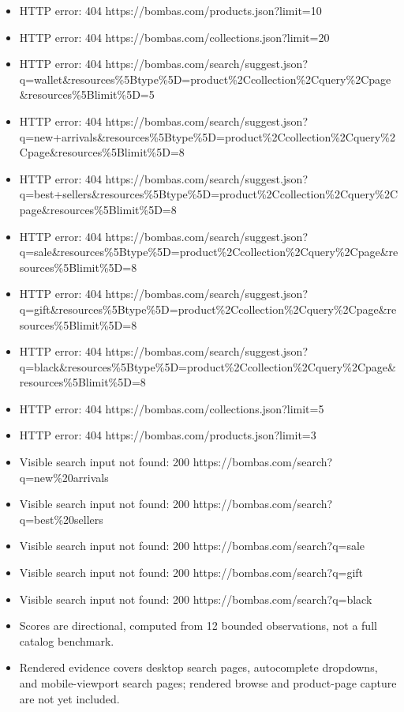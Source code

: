 \documentclass[10pt]{article}
\newcommand{\ReportBody}[1]{{\fontsize{9.4}{11.5}\selectfont\color{NVIInk}#1}}
\begin{document}
\begin{itemize}
\item \ReportBody{HTTP error: 404 https://bombas.com/products.json?limit=10}
\item \ReportBody{HTTP error: 404 https://bombas.com/collections.json?limit=20}
\item \ReportBody{HTTP error: 404 https://bombas.com/search/suggest.json?q=wallet\&resources\%5Btype\%5D=product\%2Ccollection\%2Cquery\%2Cpage\&resources\%5Blimit\%5D=5}
\item \ReportBody{HTTP error: 404 https://bombas.com/search/suggest.json?q=new+arrivals\&resources\%5Btype\%5D=product\%2Ccollection\%2Cquery\%2Cpage\&resources\%5Blimit\%5D=8}
\item \ReportBody{HTTP error: 404 https://bombas.com/search/suggest.json?q=best+sellers\&resources\%5Btype\%5D=product\%2Ccollection\%2Cquery\%2Cpage\&resources\%5Blimit\%5D=8}
\item \ReportBody{HTTP error: 404 https://bombas.com/search/suggest.json?q=sale\&resources\%5Btype\%5D=product\%2Ccollection\%2Cquery\%2Cpage\&resources\%5Blimit\%5D=8}
\item \ReportBody{HTTP error: 404 https://bombas.com/search/suggest.json?q=gift\&resources\%5Btype\%5D=product\%2Ccollection\%2Cquery\%2Cpage\&resources\%5Blimit\%5D=8}
\item \ReportBody{HTTP error: 404 https://bombas.com/search/suggest.json?q=black\&resources\%5Btype\%5D=product\%2Ccollection\%2Cquery\%2Cpage\&resources\%5Blimit\%5D=8}
\item \ReportBody{HTTP error: 404 https://bombas.com/collections.json?limit=5}
\item \ReportBody{HTTP error: 404 https://bombas.com/products.json?limit=3}
\item \ReportBody{Visible search input not found: 200 https://bombas.com/search?q=new\%20arrivals}
\item \ReportBody{Visible search input not found: 200 https://bombas.com/search?q=best\%20sellers}
\item \ReportBody{Visible search input not found: 200 https://bombas.com/search?q=sale}
\item \ReportBody{Visible search input not found: 200 https://bombas.com/search?q=gift}
\item \ReportBody{Visible search input not found: 200 https://bombas.com/search?q=black}
\item \ReportBody{Scores are directional, computed from 12 bounded observations, not a full catalog benchmark.}
\item \ReportBody{Rendered evidence covers desktop search pages, autocomplete dropdowns, and mobile-viewport search pages; rendered browse and product-page capture are not yet included.}
\end{itemize}
\end{document}
